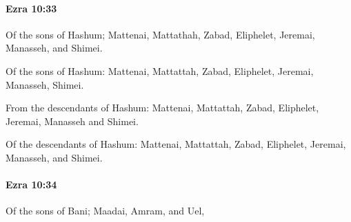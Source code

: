 		\paragraph{Ezra 10:33} %
			\label{EZRA-10-33}

			Of the sons of Hashum; Mattenai, Mattathah, Zabad, Eliphelet, Jeremai, Manasseh, and Shimei.

			\begin{versebox}
					\item[BHS] 
					\item[LXX] 
					\item[ASV] Of the sons of Hashum: Mattenai, Mattattah, Zabad, Eliphelet, Jeremai, Manasseh, Shimei.
					\item[NIV] From the descendants of Hashum: Mattenai, Mattattah, Zabad, Eliphelet, Jeremai, Manasseh and Shimei.
					\item[NRSV] Of the descendants of Hashum: Mattenai, Mattattah, Zabad, Eliphelet, Jeremai, Manasseh, and Shimei.
			\end{versebox}

		\paragraph{Ezra 10:34} %
			\label{EZRA-10-34}

			Of the sons of Bani; Maadai, Amram, and Uel,

